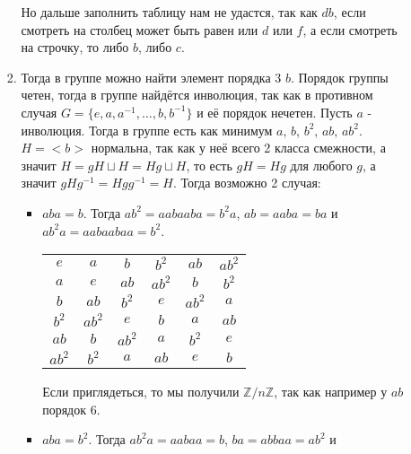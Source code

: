 \documentclass{article}
\begin{document}
\begin{enumerate}
\begin{itemize}
\begin{enumerate}
\begin{center}
                        \end{center}
                        Но дальше заполнить таблицу нам не удастся, так
                        как $db$, если смотреть на столбец может быть равен или
                        $d$ или $f$, а если смотреть на строчку, то либо $b$,
                        либо $c$.
                    \item Тогда в группе можно найти элемент порядка 3 $b$.
                        Порядок группы четен, тогда в группе найдётся инволюция,
                        так как в противном случая $G=\{e,a,a^{-1},\ldots ,b,b^{-1}\}$
                        и её порядок нечетен. Пусть $a$ - инволюция.
                        Тогда в группе есть как минимум $a$, $b$, $b^2$, $ab$,
                        $ab^2$. $H=<b>$ нормальна, так как у неё всего 2 класса
                        смежности, а значит $H=gH\sqcup H=Hg\sqcup H$, то есть
                        $gH=Hg$ для любого $g$, а значит $gHg^{-1}=Hgg^{-1}=H$.
                        Тогда возможно 2 случая:
                    \begin{itemize}
                        \item $aba=b$. Тогда $ab^2=aabaaba=b^2a$, $ab=aaba=ba$
                            и $ab^2a=aabaabaa=b^2$. 
                        \begin{center}
                        \noindent\begin{tabular}{c | c c c c c}
                            $e$ & $a$ & $b$ & $b^2$ & $ab$ & $ab^2$ \\
                            \cline{1-6}
                            $a$ & $e$ & $ab$ & $ab^2$ & $b$ & $b^2$\\
                            $b$ & $ab$ & $b^2$ & $e$ & $ab^2$ & $a$\\
                            $b^2$ & $ab^2$ & $e$ & $b$ & $a$ & $ab$\\
                            $ab$ & $b$ & $ab^2$ & $a$ & $b^2$ & $e$\\
                            $ab^2$ & $b^2$ & $a$ & $ab$ & $e$ & $b$\\
                        \end{tabular}
                        \end{center}
                            Если приглядеться, то мы получили $\mathbb{Z}/n\mathbb{Z}$,
                            так как например у $ab$ порядок 6.
                        \item $aba=b^2$. Тогда $ab^2a=aabaa=b$, $ba=abbaa=ab^2$ и

\end{itemize}
\end{enumerate}
\end{itemize}
\end{enumerate}
\end{document}
